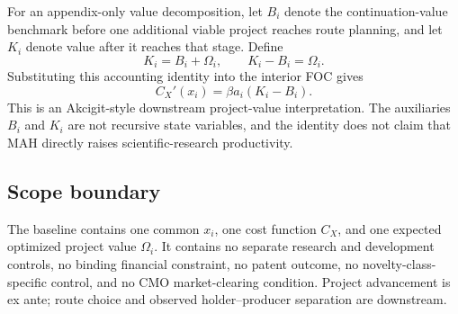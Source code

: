 For an appendix-only value decomposition, let \(B_i\) denote the continuation-value
benchmark before one additional viable project reaches route planning, and
let \(K_i\) denote value after it reaches that stage. Define
\begin{equation}
  K_i=B_i+\Omega_i,
  \qquad
  K_i-B_i=\Omega_i.
  \label{eq:p05-value-gap}
\end{equation}
Substituting this accounting identity into the interior FOC gives
\begin{equation}
  C_X'(x_i)
  =
  \beta a_i(K_i-B_i).
  \label{eq:p05-value-gap-foc}
\end{equation}
This is an Akcigit-style downstream project-value interpretation. The
auxiliaries \(B_i\) and \(K_i\) are not recursive state variables, and the
identity does not claim that MAH directly raises scientific-research
productivity.

\subsection{Scope boundary}
\label{subsec:p05-scope}

The baseline contains one common \(x_i\), one cost function \(C_X\), and one
expected optimized project value \(\Omega_i\). It contains no separate
research and development controls, no binding financial constraint, no
patent outcome, no novelty-class-specific control, and no CMO market-clearing
condition. Project advancement is ex ante; route choice and observed
holder--producer separation are downstream.
